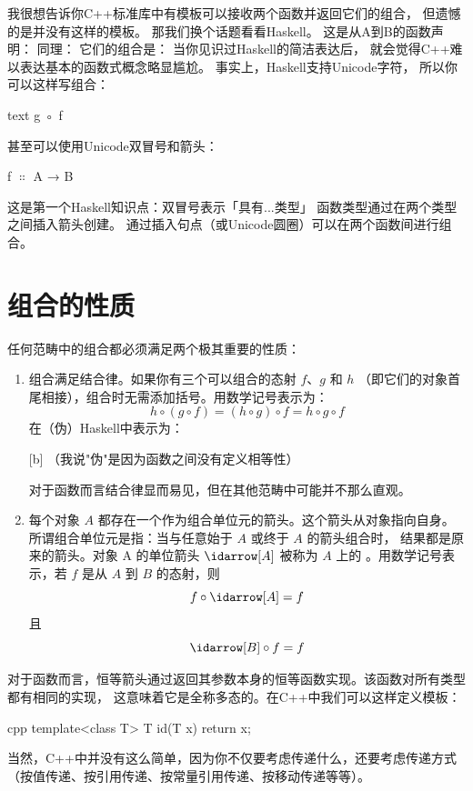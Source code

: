 我很想告诉你C++标准库中有模板可以接收两个函数并返回它们的组合，
但遗憾的是并没有这样的模板。
那我们换个话题看看Haskell。
这是从A到B的函数声明：
同理：
它们的组合是：
当你见识过Haskell的简洁表达后，
就会觉得C++难以表达基本的函数式概念略显尴尬。
事实上，Haskell支持Unicode字符，
所以你可以这样写组合：
\begin{snip}{text}
g ◦ f
\end{snip}

甚至可以使用Unicode双冒号和箭头：
\begin{snipv}
f \ensuremath{\Colon} A → B
\end{snipv}
这是第一个Haskell知识点：双冒号表示「具有...类型」
函数类型通过在两个类型之间插入箭头创建。
通过插入句点（或Unicode圆圈）可以在两个函数间进行组合。

\section{组合的性质}

任何范畴中的组合都必须满足两个极其重要的性质：

\begin{enumerate}
  \item
        组合满足结合律。如果你有三个可以组合的态射 $f$、$g$ 和 $h$
        （即它们的对象首尾相接），组合时无需添加括号。用数学记号表示为：
        $$h \circ (g \circ f) = (h \circ g) \circ f = h \circ g \circ f$$
        在（伪）Haskell中表示为：

        [b]
        （我说"伪"是因为函数之间没有定义相等性）

        对于函数而言结合律显而易见，但在其他范畴中可能并不那么直观。

  \item
        每个对象 $A$ 都存在一个作为组合单位元的箭头。这个箭头从对象指向自身。
        所谓组合单位元是指：当与任意始于 $A$ 或终于 $A$ 的箭头组合时，
        结果都是原来的箭头。对象 A 的单位箭头 $\idarrow[A]$ 被称为 $A$ 上的
        。用数学记号表示，若 $f$ 是从 $A$ 到 $B$ 的态射，则
        $$f \circ \idarrow[A] = f$$
        且
        $$\idarrow[B] \circ f = f$$
\end{enumerate}
对于函数而言，恒等箭头通过返回其参数本身的恒等函数实现。该函数对所有类型都有相同的实现，
这意味着它是全称多态的。在C++中我们可以这样定义模板：

\begin{snip}{cpp}
template<class T> T id(T x) { return x; }
\end{snip}
当然，C++中并没有这么简单，因为你不仅要考虑传递什么，还要考虑传递方式
（按值传递、按引用传递、按常量引用传递、按移动传递等等）。


